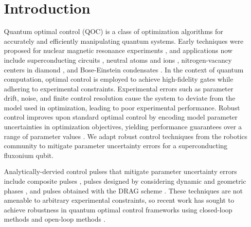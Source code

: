 \section{Introduction}
Quantum optimal control (QOC) is a class of optimization
algorithms for accurately and efficiently manipulating quantum systems.
Early techniques were proposed for nuclear magnetic resonance experiments
\cite{vandersypen2005nmr, kehlet2004improving, khaneja2005optimal,
  maximov2008optimal, nielsen2010optimal, skinner2003application, tosner2009optimal},
and applications now include superconducting circuits \cite{abdelhafez2020universal,
  chakram2020multimode, fisher2010optimal, gokhale2019partial,
  leng2019robust, leung2017speedup, li2020fast},
neutral atoms and ions \cite{brouzos2015quantum,
  de2008optimal, goerz2011quantum, guo2019high, jensen2019time,
  larrouy2020fast, omran2019generation, rosi2013fast, sorensen2019qengine,
  treutlein2006microwave, van2016optimal},
nitrogen-vacancy centers in diamond \cite{chou2015optimal,
  dolde2014high, geng2016experimental,
  nobauer2015smooth, poggiali2018optimal, rembold2020introduction, tian2019optimal},
and Bose-Einstein condensates \cite{amri2019optimal, sorensen2018quantum}.
In the context of quantum computation,
optimal control is employed to achieve high-fidelity gates
while adhering to experimental constraints.
Experimental errors such as parameter drift, noise, and
finite control resolution cause the system to deviate
from the model used in optimization, leading
to poor experimental performance.
Robust control improves upon
standard optimal control by encoding
model parameter uncertainties
in optimization objectives, yielding performance
guarantees over a range of parameter values \cite{Zhou97,Morimoto00,Manchester18}.
We adapt robust control techniques from the robotics community to mitigate
parameter uncertainty errors for
a superconducting fluxonium qubit.

Analytically-dervied control pulses that mitigate parameter uncertainty
errors include composite pulses \cite{cummins2000use, cummins2003tackling,
  kupce1995stretched, merrill2014progress},
pulses designed by considering dynamic and geometric phases
\cite{han2020experimental, xu2020nonadiabatic}, and
pulses obtained with the DRAG scheme \cite{motzoi2009simple}.
These techniques are not amenable to arbitrary experimental constraints,
so recent work has sought to achieve robustness in quantum optimal
control frameworks using closed-loop methods \cite{egger2014adaptive, feng2018gradient,
  wittler2020integrated} and open-loop methods \cite{
  allen2019robust, carvalho2020error, reinhold2019controlling,
  rembold2020introduction, kosut2013robust}.

